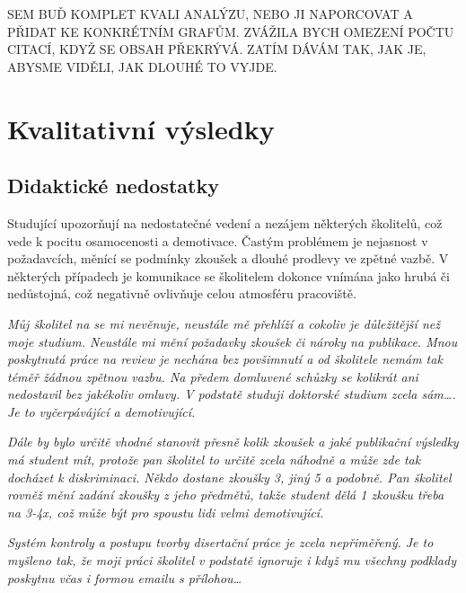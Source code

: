 \documentclass[
  czech,
  14pt,
  a4paper,
  DIV=11,
  numbers=noendperiod]{scrreprt}
\makeatletter
\newcommand*\pandocbounded[1]{%
  \sbox\pandoc@box{#1}%
  \Gscale@div\@tempa{\textheight}{\dimexpr\ht\pandoc@box+\dp\pandoc@box\relax}%
  \Gscale@div\@tempb{\linewidth}{\wd\pandoc@box}%
  \ifdim\@tempb\p@<\@tempa\p@\let\@tempa\@tempb\fi%
  \ifdim\@tempa\p@<\p@\scalebox{\@tempa}{\usebox\pandoc@box}%
  \else\usebox{\pandoc@box}%
  \fi%
}
\makeatother
\begin{document}
\begin{figure}[H]

\caption{\label{fig-finance}}

\centering{

\pandocbounded{\texttt{[image: figs/finance.png]}}

}

\end{figure}%

SEM BUĎ KOMPLET KVALI ANALÝZU, NEBO JI NAPORCOVAT A PŘIDAT KE KONKRÉTNÍM
GRAFŮM. ZVÁŽILA BYCH OMEZENÍ POČTU CITACÍ, KDYŽ SE OBSAH PŘEKRÝVÁ. ZATÍM
DÁVÁM TAK, JAK JE, ABYSME VIDĚLI, JAK DLOUHÉ TO VYJDE.

\chapter{Kvalitativní výsledky}\label{kvalitativnuxed-vuxfdsledky}

\section{Didaktické nedostatky}\label{didaktickuxe9-nedostatky}

Studující upozorňují na nedostatečné vedení a nezájem některých
školitelů, což vede k pocitu osamocenosti a demotivace. Častým problémem
je nejasnost v požadavcích, měnící se podmínky zkoušek a dlouhé prodlevy
ve zpětné vazbě. V některých případech je komunikace se školitelem
dokonce vnímána jako hrubá či nedůstojná, což negativně ovlivňuje celou
atmosféru pracoviště.

\emph{Můj školitel na se mi nevěnuje, neustále mě přehlíží a cokoliv je
důležitější než moje studium. Neustále mi mění požadavky zkoušek či
nároky na publikace. Mnou poskytnutá práce na review je nechána bez
povšimnutí a od školitele nemám tak téměř žádnou zpětnou vazbu. Na
předem domluvené schůzky se kolikrát ani nedostavil bez jakékoliv
omluvy. V podstatě studuji doktorské studium zcela sám\ldots. Je to
vyčerpávájící a demotivující.}

\emph{Dále by bylo určitě vhodné stanovit přesně kolik zkoušek a jaké
publikační výsledky má student mít, protože pan školitel to určitě zcela
náhodně a může zde tak docházet k diskriminaci. Někdo dostane zkoušky 3,
jiný 5 a podobně. Pan školitel rovněž mění zadání zkoušky z jeho
předmětů, takže student dělá 1 zkoušku třeba na 3-4x, což může být pro
spoustu lidi velmi demotivující.}

\emph{Systém kontroly a postupu tvorby disertační práce je zcela
nepřiměřený. Je to myšleno tak, že moji práci školitel v podstatě
ignoruje i když mu všechny podklady poskytnu včas i formou emailu s
přílohou\ldots{} }
\end{document}
